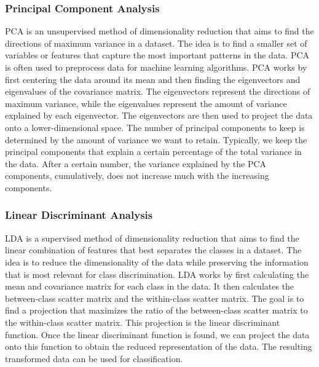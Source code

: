         \subsubsection{Principal Component Analysis}
            PCA is an unsupervised method of dimensionality reduction that aims to find the directions of maximum variance in a dataset. The idea is to find a smaller set of variables or features that capture the most important patterns in the data. PCA is often used to preprocess data for machine learning algorithms.
            PCA works by first centering the data around its mean and then finding the eigenvectors and eigenvalues of the covariance matrix. The eigenvectors represent the directions of maximum variance, while the eigenvalues represent the amount of variance explained by each eigenvector. The eigenvectors are then used to project the data onto a lower-dimensional space.
            The number of principal components to keep is determined by the amount of variance we want to retain. Typically, we keep the principal components that explain a certain percentage of the total variance in the data. After a certain number, the variance explained by the PCA components, cumulatively, does not increase much with the increasing components.
        \subsubsection{Linear Discriminant Analysis}
            LDA is a supervised method of dimensionality reduction that aims to find the linear combination of features that best separates the classes in a dataset. The idea is to reduce the dimensionality of the data while preserving the information that is most relevant for class discrimination.
            LDA works by first calculating the mean and covariance matrix for each class in the data. It then calculates the between-class scatter matrix and the within-class scatter matrix. The goal is to find a projection that maximizes the ratio of the between-class scatter matrix to the within-class scatter matrix. This projection is the linear discriminant function.
            Once the linear discriminant function is found, we can project the data onto this function to obtain the reduced representation of the data. The resulting transformed data can be used for classification.
